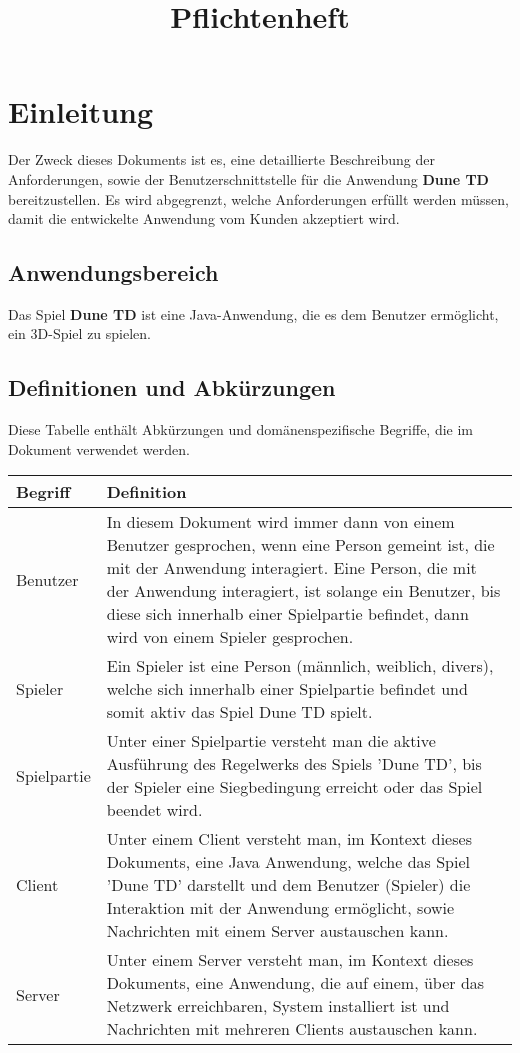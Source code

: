 \documentclass{uulm-assignment}
\title{Pflichtenheft}
\begin{document}
\maketitle

\section{Einleitung}

Der Zweck dieses Dokuments ist es, eine detaillierte Beschreibung der Anforderungen, sowie der
Benutzerschnittstelle für die Anwendung \textbf{Dune TD} bereitzustellen. Es wird abgegrenzt, welche
Anforderungen erfüllt werden müssen, damit die entwickelte Anwendung vom Kunden akzeptiert
wird.

\subsection{Anwendungsbereich}

Das Spiel \textbf{Dune TD} ist eine Java-Anwendung, die es dem Benutzer ermöglicht, ein 3D-Spiel zu spielen.

\subsection{Definitionen und Abkürzungen}

Diese Tabelle enthält Abkürzungen und domänenspezifische Begriffe, die im Dokument verwendet
werden.

\begin{tabularx}{16cm}{l|X}
\textbf{Begriff} & \textbf{Definition} \\
\hline
Benutzer & In diesem Dokument wird immer dann von einem Benutzer gesprochen, wenn eine Person gemeint ist, die mit der Anwendung interagiert. Eine Person, die mit der Anwendung interagiert, ist solange ein Benutzer, bis diese sich innerhalb einer Spielpartie befindet, dann wird von einem Spieler gesprochen.\\
\hline
Spieler & Ein Spieler ist eine Person (männlich, weiblich, divers), welche sich innerhalb einer Spielpartie befindet und somit aktiv das Spiel Dune TD spielt. \\
\hline
Spielpartie & Unter einer Spielpartie versteht man die aktive Ausführung des Regelwerks des Spiels 'Dune TD', bis der Spieler eine Siegbedingung erreicht oder das Spiel beendet wird. \\
\hline
Client & Unter einem Client versteht man, im Kontext dieses Dokuments, eine Java Anwendung, welche das Spiel 'Dune TD' darstellt und dem Benutzer (Spieler) die Interaktion mit der Anwendung ermöglicht, sowie Nachrichten mit einem Server austauschen kann. \\
\hline
Server & Unter einem Server versteht man, im Kontext dieses Dokuments, eine Anwendung, die auf einem, über das Netzwerk erreichbaren, System installiert ist und Nachrichten mit mehreren Clients austauschen kann. \\
\end{tabularx}
\end{document}
